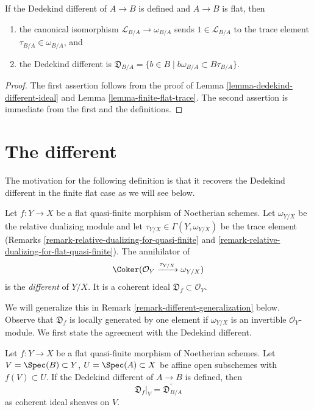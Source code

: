 \begin{lemma}
\label{lemma-flat-dedekind-complementary-module-trace}
If the Dedekind different of $A \to B$ is defined and $A \to B$ is flat, then
\begin{enumerate}
\item the canonical isomorphism $\mathcal{L}_{B/A} \to \omega_{B/A}$
sends $1 \in \mathcal{L}_{B/A}$ to the trace element
$\tau_{B/A} \in \omega_{B/A}$, and
\item the Dedekind different is
$\mathfrak{D}_{B/A} = \{b \in B \mid b\omega_{B/A} \subset B\tau_{B/A}\}$.
\end{enumerate}
\end{lemma}

\begin{proof}
The first assertion
follows from the proof of Lemma \ref{lemma-dedekind-different-ideal}
and Lemma \ref{lemma-finite-flat-trace}.
The second assertion is immediate from the first and the
definitions.
\end{proof}



\section{The different}
\label{section-different}

\noindent
The motivation for the following definition is that it recovers the
Dedekind different in the finite flat case as we will see below.

\begin{definition}
\label{definition-different}
Let $f : Y \to X$ be a flat quasi-finite morphism of Noetherian schemes.
Let $\omega_{Y/X}$ be the relative dualizing module and let
$\tau_{Y/X} \in \Gamma(Y, \omega_{Y/X})$ be the trace element
(Remarks \ref{remark-relative-dualizing-for-quasi-finite} and
\ref{remark-relative-dualizing-for-flat-quasi-finite}).
The annihilator of
$$
\Coker(\mathcal{O}_Y \xrightarrow{\tau_{Y/X}} \omega_{Y/X})
$$
is the {\it different} of $Y/X$. It is a coherent ideal
$\mathfrak{D}_f \subset \mathcal{O}_Y$.
\end{definition}

\noindent
We will generalize this in Remark \ref{remark-different-generalization} below.
Observe that $\mathfrak{D}_f$ is locally generated by one element if
$\omega_{Y/X}$ is an invertible $\mathcal{O}_Y$-module.
We first state the agreement with the Dedekind different.

\begin{lemma}
\label{lemma-flat-agree-dedekind}
Let $f : Y \to X$ be a flat quasi-finite morphism of Noetherian schemes.
Let $V = \Spec(B) \subset Y$, $U = \Spec(A) \subset X$
be affine open subschemes with $f(V) \subset U$.
If the Dedekind different of $A \to B$ is defined, then
$$
\mathfrak{D}_f|_V = \widetilde{\mathfrak{D}_{B/A}}
$$
as coherent ideal sheaves on $V$.
\end{lemma}

